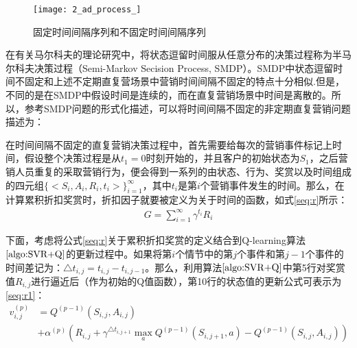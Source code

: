\begin{figure}[htbp]
\centering
\texttt{[image: 2\_ad\_process\_]}
\caption{固定时间间隔序列和不固定时间间隔序列}
\label{fig:2_ad_process_}
\end{figure}

在有关马尔科夫的理论研究中，将状态逗留时间服从任意分布的决策过程称为半马尔科夫决策过程（Semi-Markov Secision Process, SMDP）\citep{guo2015survey}。SMDP中状态逗留时间不固定和上述不定期直复营场景中营销时间间隔不固定的特点十分相似.但是，不同的是在SMDP中假设时间是连续的，而在直复营销场景中时间是离散的。所以，参考SMDP问题的形式化描述，可以将时间间隔不固定的非定期直复营销问题描述为：

在时间间隔不固定的直复营销决策过程中，首先需要给每次的营销事件标记上时间，假设整个决策过程是从$t_{1}=0$时刻开始的，并且客户的初始状态为$S_{1}$，之后营销人员重复的采取营销行为，便会得到一系列的由状态、行为、奖赏以及时间组成的四元组$\{<S_{i},A_{i},R_{i},t_{i}>\}_{i=1}^{\infty}$，其中$t_{i}$是第$i$个营销事件发生的时间。那么，在计算累积折扣奖赏时，折扣因子就要被定义为关于时间的函数，如式\eqref{seq:r}所示：
\begin{equation}\label{seq:r}
\begin{aligned}
G=\sum_{i=1}^{\infty} \gamma^{t_{i}}R_{i}
\end{aligned}
\end{equation}

下面，考虑将公式\eqref{seq:r}关于累积折扣奖赏的定义结合到Q-learning算法$\ref{algo:SVR+Q}$的更新过程中。如果将第$i$个情节中的第$j$个事件和第$j-1$个事件的时间差记为：$\triangle t_{i,j} = t_{i,j}-t_{i,j-1}$。那么，利用算法$\ref{algo:SVR+Q}$中第5行对奖赏值$R_{i,j}$进行逼近后（作为初始的Q值函数），第10行的状态值的更新公式可表示为\eqref{seq:r1}：
\begin{equation}\label{seq:r1}
\begin{aligned}
v_{i,j}^{(p)}&=Q^{(p-1)}(S_{i,j},A_{i,j}) \\
&+  \alpha^{(p)} (R_{i,j} + \gamma^{\triangle t_{i,j+1}} \max_{a} Q^{(p-1)}(S_{i,j+1},a)-Q^{(p-1)}(S_{i,j},A_{i,j}))\\
\end{aligned}
\end{equation}

